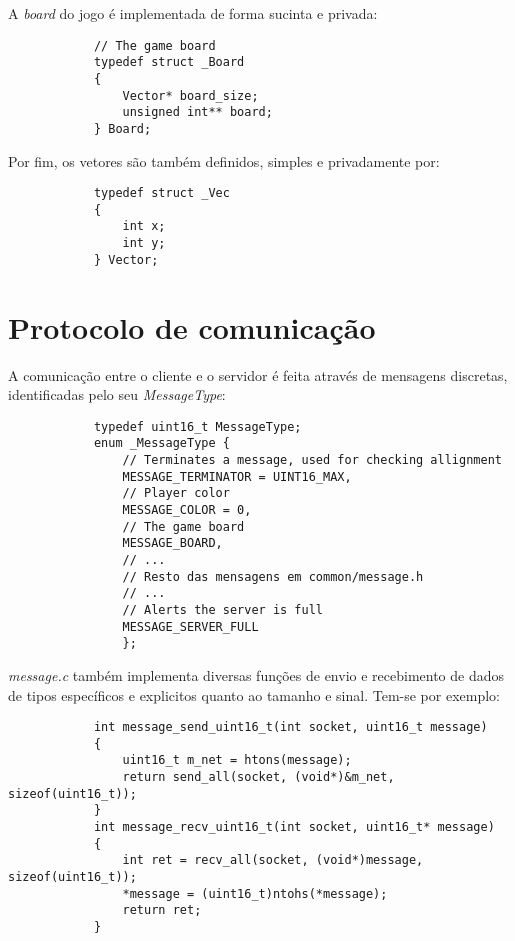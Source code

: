 \documentclass[a4paper]{report}
\begin{document}
        \par A \textit{board} do jogo é implementada de forma sucinta e privada:
        \begin{lstlisting}
            // The game board
            typedef struct _Board
            {
                Vector* board_size;
                unsigned int** board;
            } Board;
        \end{lstlisting}

        \par Por fim, os vetores são também definidos, simples e privadamente por:
        \begin{lstlisting}
            typedef struct _Vec
            {
                int x;
                int y;
            } Vector;
        \end{lstlisting}
    
    \section{Protocolo de comunicação}

        \par A comunicação entre o cliente e o servidor é feita através de mensagens discretas, identificadas pelo seu \textit{MessageType}:
        \begin{lstlisting}
            typedef uint16_t MessageType;
            enum _MessageType {
                // Terminates a message, used for checking allignment
                MESSAGE_TERMINATOR = UINT16_MAX, 
                // Player color
                MESSAGE_COLOR = 0, 
                // The game board
                MESSAGE_BOARD,
                // ...
                // Resto das mensagens em common/message.h
                // ...
                // Alerts the server is full
                MESSAGE_SERVER_FULL
                };
        \end{lstlisting}

        \par \textit{message.c} também implementa diversas funções de envio e recebimento de dados de tipos específicos e explicitos quanto ao tamanho e sinal. Tem-se por exemplo:
        \begin{lstlisting}
            int message_send_uint16_t(int socket, uint16_t message)
            {
                uint16_t m_net = htons(message);
                return send_all(socket, (void*)&m_net, sizeof(uint16_t));
            }
            int message_recv_uint16_t(int socket, uint16_t* message)
            {
                int ret = recv_all(socket, (void*)message, sizeof(uint16_t));
                *message = (uint16_t)ntohs(*message);
                return ret;
            }
        \end{lstlisting}
\end{document}
